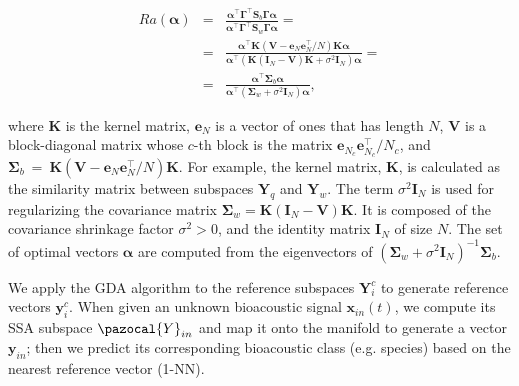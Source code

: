 {\begin{eqnarray}
    Ra(\mathbf{\alpha}) &=& \frac{\mathbf{\alpha}^{\top}\mathbf{\Gamma}^{\top}\mathbf{S}_{b}\mathbf{\Gamma} \mathbf{\alpha}}{\mathbf{\alpha}^{\top}\mathbf{\Gamma} ^{\top}\mathbf{S}_{w}\mathbf{\Gamma} \mathbf{\alpha}} = \nonumber\\
    &=& \frac{\mathbf{\alpha}^{\top}\mathbf{K}(\mathbf{V} - \mathbf{e}_{N}\mathbf{e}_{N}^{\top}/N)\mathbf{K}\mathbf{\alpha}}{\mathbf{\alpha}^{\top}(\mathbf{K}(\mathbf{I}_{N}-\mathbf{V})\mathbf{K}+ \sigma^{2}\mathbf{I}_{N})\mathbf{\alpha}} = \nonumber\\
    &=& \frac{\mathbf{\alpha}^{\top}\mathbf{\Sigma}_{b}\mathbf{\alpha}}{\mathbf{\alpha}^{\top}(\mathbf{\Sigma}_{w}+\sigma^{2}\mathbf{I}_{N})\mathbf{\alpha}},
\end{eqnarray}


\noindent where $\mathbf{K}$ is the kernel matrix, $\mathbf{e}_{N}$ is a vector
of ones that has length $N$, $\mathbf{V}$ is a block-diagonal matrix
whose $c$-th block is the matrix $\mathbf{e}_{N_{c}}\mathbf{e}_{N_{c}}^{\top}/ N_{c}$, and $\mathbf{\Sigma}_{b}~=~\mathbf{K}(\mathbf{V} - \mathbf{e}_{N}\mathbf{e}_{N}^{\top}/N)\mathbf{K}$.
For example, the kernel matrix, $\mathbf{K}$, is calculated as the similarity matrix between subspaces $\mathbf{Y}_{q}$ and $\mathbf{Y}_{w}$.
The term $\sigma^{2} \mathbf{I}_{N}$ is used for regularizing the covariance matrix $\mathbf{\Sigma}_{w} = \mathbf{K}(\mathbf{I}_{N}  -\mathbf{V})\mathbf{K}$. It is composed of the covariance shrinkage factor $\sigma^{2} > 0$, and the identity matrix $\mathbf{I}_{N}$ of size $N$. The set of optimal vectors $\mathbf{\alpha}$ are computed from the eigenvectors of $(\mathbf{\Sigma}_{w}+\sigma^{2}\mathbf{I}_{N})^{-1}\mathbf{\Sigma}_{b}$.

We apply the GDA algorithm to the reference subspaces $\mathbf{Y}_{i}^{c}$ to generate reference vectors $\mathbf{y}_{i}^{c}$. When given an unknown bioacoustic signal $\mathbf{x}_{in}(t)$, we compute its SSA subspace $\pazocal{Y}_{in}$ and map it onto the manifold to generate a vector $\mathbf{y}_{in}$; then we predict its corresponding bioacoustic class (e.g. species)  based on the nearest reference vector (1-NN).


}
